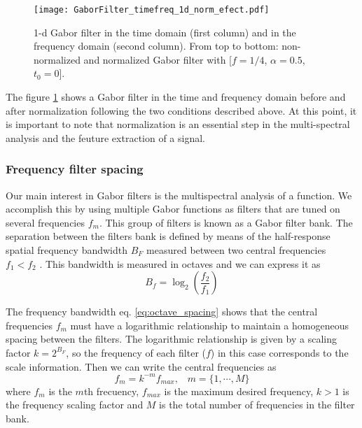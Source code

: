 \begin{figure}[!ht]
\centering
\texttt{[image: GaborFilter\_timefreq\_1d\_norm\_efect.pdf]}
\caption{1-d Gabor filter in the time domain (first column) and in the frequency domain (second  column). From top to bottom: non-normalized and normalized Gabor filter with [$f =1/4$, $\alpha=0.5$, $t_0=0$].}\label{fig:GaborFilter_timefreq_norm_efect}
\end{figure}

The figure \ref{fig:GaborFilter_timefreq_norm_efect} shows a Gabor filter in the time and frequency domain before and after normalization following the two conditions described above. At this point, it is important to note that normalization is an essential step in the multi-spectral analysis and the feuture extraction of a signal.

\subsubsection{Frequency filter spacing}\label{subsec:frequency_filter_spacing}
Our main interest in Gabor filters is the multispectral analysis of a function. We accomplish this by using multiple Gabor functions as filters that are tuned on several frequencies $f_m$. This group of filters is known as a Gabor filter bank. The separation between the filters bank is defined by means of the half-response spatial frequency bandwidth $B_F$ measured between two central frequencies $f_1 < f_2$ \citep{Granlund:CGIP:1978}. This bandwidth is measured in octaves and we can express it as
\begin{equation}\label{eq:octave_spacing}
    B_f = \log_2 \left( \frac{f_2}{f_1} \right)
\end{equation}

The frequency bandwidth eq. \eqref{eq:octave_spacing} shows that the central frequencies $f_m$ must have a logarithmic relationship to maintain a homogeneous spacing between the filters. The logarithmic relationship is given by a scaling factor $k=2^{B_F}$, so the frequency of each filter ($f$) in this case corresponds to the scale information. Then we can write the central frequencies as
\begin{equation}
	f_m = k^{-m} f_{max}\textrm{,} \quad m = \{1, \cdots, M\} \label{eq:filterbank_frequencies}
\end{equation} 
where $f_m$ is the $m$th frecuency, $f_{max}$ is the maximum desired frequency, $k>1$ is the frequency scaling factor and $M$ is the total number of frequencies in the filter bank.

